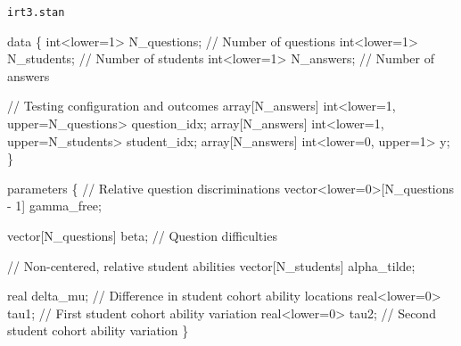 \documentclass[
  letterpaper,
  DIV=11,
  numbers=noendperiod]{scrartcl}
\newenvironment{Shaded}{\begin{snugshade}}{\end{snugshade}}
\newcommand{\CommentTok}[1]{\textcolor[rgb]{0.37,0.37,0.37}{#1}}
\newcommand{\DataTypeTok}[1]{\textcolor[rgb]{0.68,0.00,0.00}{#1}}
\newcommand{\DecValTok}[1]{\textcolor[rgb]{0.68,0.00,0.00}{#1}}
\newcommand{\KeywordTok}[1]{\textcolor[rgb]{0.00,0.23,0.31}{#1}}
\newcommand{\NormalTok}[1]{\textcolor[rgb]{0.00,0.23,0.31}{#1}}
\begin{document}
\begin{codelisting}

\caption{\texttt{irt3.stan}}

\begin{Shaded}
\begin{Highlighting}[]
\KeywordTok{data}\NormalTok{ \{}
  \DataTypeTok{int}\NormalTok{\textless{}}\KeywordTok{lower}\NormalTok{=}\DecValTok{1}\NormalTok{\textgreater{} N\_questions; }\CommentTok{// Number of questions}
  \DataTypeTok{int}\NormalTok{\textless{}}\KeywordTok{lower}\NormalTok{=}\DecValTok{1}\NormalTok{\textgreater{} N\_students;  }\CommentTok{// Number of students}
  \DataTypeTok{int}\NormalTok{\textless{}}\KeywordTok{lower}\NormalTok{=}\DecValTok{1}\NormalTok{\textgreater{} N\_answers;   }\CommentTok{// Number of answers}

  \CommentTok{// Testing configuration and outcomes}
  \DataTypeTok{array}\NormalTok{[N\_answers] }\DataTypeTok{int}\NormalTok{\textless{}}\KeywordTok{lower}\NormalTok{=}\DecValTok{1}\NormalTok{, }\KeywordTok{upper}\NormalTok{=N\_questions\textgreater{} question\_idx;}
  \DataTypeTok{array}\NormalTok{[N\_answers] }\DataTypeTok{int}\NormalTok{\textless{}}\KeywordTok{lower}\NormalTok{=}\DecValTok{1}\NormalTok{, }\KeywordTok{upper}\NormalTok{=N\_students\textgreater{}  student\_idx;}
  \DataTypeTok{array}\NormalTok{[N\_answers] }\DataTypeTok{int}\NormalTok{\textless{}}\KeywordTok{lower}\NormalTok{=}\DecValTok{0}\NormalTok{, }\KeywordTok{upper}\NormalTok{=}\DecValTok{1}\NormalTok{\textgreater{} y;}
\NormalTok{\}}

\KeywordTok{parameters}\NormalTok{ \{}
  \CommentTok{// Relative question discriminations}
  \DataTypeTok{vector}\NormalTok{\textless{}}\KeywordTok{lower}\NormalTok{=}\DecValTok{0}\NormalTok{\textgreater{}[N\_questions {-} }\DecValTok{1}\NormalTok{] gamma\_free;}

  \DataTypeTok{vector}\NormalTok{[N\_questions] beta;  }\CommentTok{// Question difficulties}

  \CommentTok{// Non{-}centered, relative student abilities}
  \DataTypeTok{vector}\NormalTok{[N\_students] alpha\_tilde;}

  \DataTypeTok{real}\NormalTok{ delta\_mu;       }\CommentTok{// Difference in student cohort ability locations}
  \DataTypeTok{real}\NormalTok{\textless{}}\KeywordTok{lower}\NormalTok{=}\DecValTok{0}\NormalTok{\textgreater{} tau1;  }\CommentTok{// First student cohort ability variation}
  \DataTypeTok{real}\NormalTok{\textless{}}\KeywordTok{lower}\NormalTok{=}\DecValTok{0}\NormalTok{\textgreater{} tau2;  }\CommentTok{// Second student cohort ability variation}
\NormalTok{\}}


\end{Highlighting}
\end{Shaded}
\end{codelisting}
\end{document}
